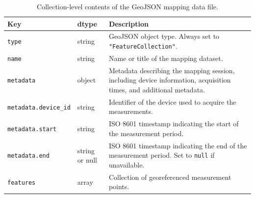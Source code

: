 \begin{table}[H]
\centering
\caption{Collection-level contents of the GeoJSON mapping data file.}
\label{tab:geojson_mapping_collection_schema}
\begin{tabular}{llp{8cm}}
\toprule
\textbf{Key} & \textbf{dtype} & \textbf{Description} \\ \midrule

\texttt{type} &
  string &
  GeoJSON object type. Always set to \texttt{"FeatureCollection"}. \\

\texttt{name} &
  string &
  Name or title of the mapping dataset. \\

\texttt{metadata} &
  object &
  Metadata describing the mapping session, including device information, acquisition times, and additional metadata. \\

\texttt{metadata.device\_id} &
  string &
  Identifier of the device used to acquire the measurements. \\

\texttt{metadata.start} &
  string &
  ISO 8601 timestamp indicating the start of the measurement period. \\

\texttt{metadata.end} &
  string or null &
  ISO 8601 timestamp indicating the end of the measurement period. Set to \texttt{null} if unavailable. \\

\texttt{features} &
  array &
  Collection of georeferenced measurement points. \\

\bottomrule
\end{tabular}
\end{table}


